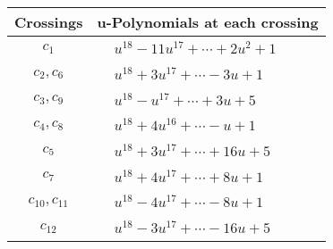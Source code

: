 \documentclass[1p]{elsarticle_modified}
\theoremstyle{definition}
\begin{document}
\begin{tabular}{m{50pt}|m{274pt}}
Crossings & \hspace{64pt}u-Polynomials at each crossing \\
\hline $$\begin{aligned}c_{1}\end{aligned}$$&$\begin{aligned}
&u^{18}-11 u^{17}+\cdots+2 u^2+1
\end{aligned}$\\
\hline $$\begin{aligned}c_{2},c_{6}\end{aligned}$$&$\begin{aligned}
&u^{18}+3 u^{17}+\cdots-3 u+1
\end{aligned}$\\
\hline $$\begin{aligned}c_{3},c_{9}\end{aligned}$$&$\begin{aligned}
&u^{18}- u^{17}+\cdots+3 u+5
\end{aligned}$\\
\hline $$\begin{aligned}c_{4},c_{8}\end{aligned}$$&$\begin{aligned}
&u^{18}+4 u^{16}+\cdots- u+1
\end{aligned}$\\
\hline $$\begin{aligned}c_{5}\end{aligned}$$&$\begin{aligned}
&u^{18}+3 u^{17}+\cdots+16 u+5
\end{aligned}$\\
\hline $$\begin{aligned}c_{7}\end{aligned}$$&$\begin{aligned}
&u^{18}+4 u^{17}+\cdots+8 u+1
\end{aligned}$\\
\hline $$\begin{aligned}c_{10},c_{11}\end{aligned}$$&$\begin{aligned}
&u^{18}-4 u^{17}+\cdots-8 u+1
\end{aligned}$\\
\hline $$\begin{aligned}c_{12}\end{aligned}$$&$\begin{aligned}
&u^{18}-3 u^{17}+\cdots-16 u+5
\end{aligned}$\\
\hline
\end{tabular}\\~\\
\end{document}
